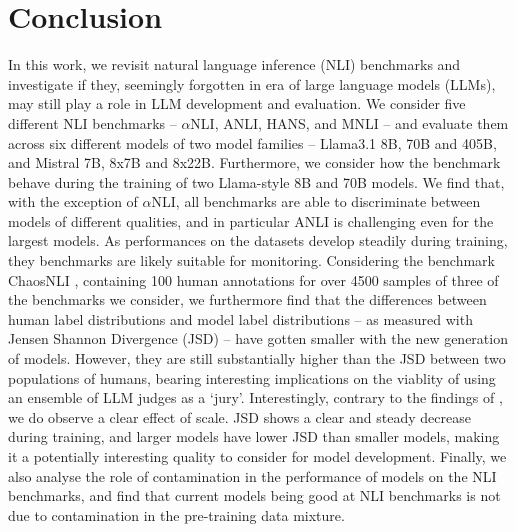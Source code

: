 \section{Conclusion}

In this work, we revisit natural language inference (NLI) benchmarks and investigate if they, seemingly forgotten in era of large language models (LLMs), may still play a role in LLM development and evaluation.
We consider five different NLI benchmarks -- $\alpha$NLI, ANLI, HANS, and MNLI -- and evaluate them across six different models of two model families -- Llama3.1 8B, 70B and 405B, and Mistral 7B, 8x7B and 8x22B.
Furthermore, we consider how the benchmark behave during the training of two Llama-style 8B and 70B models.
We find that, with the exception of $\alpha$NLI, all benchmarks are able to discriminate between models of different qualities, and in particular ANLI is challenging even for the largest models.
As performances on the datasets develop steadily during training, they benchmarks are likely suitable for monitoring.
Considering the benchmark ChaosNLI \citep{nie-etal-2020-learn}, containing 100 human annotations for over 4500 samples of three of the benchmarks we consider, we furthermore find that the differences between human label distributions and model label distributions -- as measured with Jensen Shannon Divergence (JSD) -- have gotten smaller with the new generation of models.
However, they are still substantially higher than the JSD between two populations of humans, bearing interesting implications on the viablity of using an ensemble of LLM judges as a `jury'.
Interestingly, contrary to the findings of \citet{nie-etal-2020-learn}, we do observe a clear effect of scale.
JSD shows a clear and steady decrease during training, and larger models have lower JSD than smaller models, making it a potentially interesting quality to consider for model development.
Finally, we also analyse the role of contamination in the performance of models on the NLI benchmarks, and find that current models being good at NLI benchmarks is not due to contamination in the pre-training data mixture.

% 
